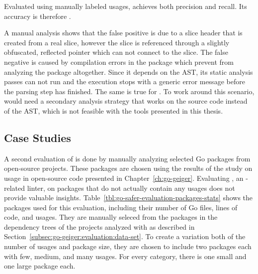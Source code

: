 \begin{hero}
    Evaluated using manually labeled \unsafe{} usages, \toolSafer{} achieves both  precision and
    recall.
    Its accuracy is therefore .
\end{hero}

A manual analysis shows that the  false positive is due to a slice header that is created from a real
slice, however the slice is referenced through a slightly obfuscated, reflected pointer which \toolSafer{} can not
connect to the slice.
The false negative is caused by compilation errors in the package which prevent \toolSafer{} from analyzing the package
altogether.
Since it depends on the \acrshort{AST}, its static analysis passes can not run and the execution stops with a generic
error message before the parsing step has finished.
The same is true for \toolGosec{}.
To work around this scenario, \toolSafer{} would need a secondary analysis strategy that works on the source code
instead of the \acrshort{AST}, which is not feasible with the tools presented in this thesis.



\subsection{Case Studies}\label{subsec:go-safer:evaluation:case-studies}

A second evaluation of \toolSafer{} is done by manually analyzing  selected Go packages from open-source
projects.
These packages are chosen using the results of the study on \unsafe{} usage in open-source code presented in
Chapter~\ref{ch:go-geiger}.
Evaluating \toolSafer{}, an \unsafe{}-related linter, on packages that do not actually contain any \unsafe{} usages does
not provide valuable insights.
Table~\ref{tbl:go-safer-evaluation-packages-stats} shows the  packages used for this evaluation, including
their number of Go files, lines of code, and \unsafe{} usages.
They are manually seleced from the packages in the dependency trees of the projects analyzed with \toolGeiger{} as
described in Section~\ref{subsec:go-geiger:evaluation:data-set}.
To create a variation both of the number of \unsafe{} usages and package size, they are chosen to include two packages
each with few, medium, and many \unsafe{} usages.
For every category, there is one small and one large package each.

